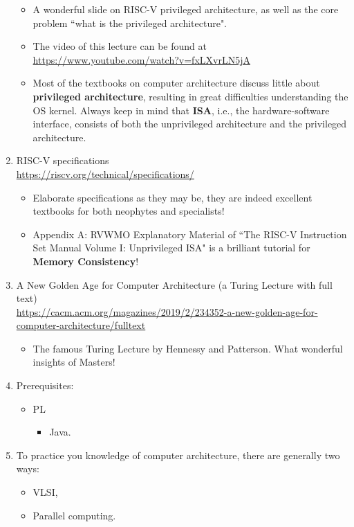 \documentclass{article}
\begin{document}
\begin{enumerate}
    \begin{itemize}
        \item A wonderful slide on RISC-V privileged architecture, as well as the core problem ``what is the privileged architecture".
        \item The video of this lecture can be found at\\ \href{https://www.youtube.com/watch?v=fxLXvrLN5jA}{https://www.youtube.com/watch?v=fxLXvrLN5jA}
        \item Most of the textbooks on computer architecture discuss little about \textbf{privileged architecture}, resulting in great difficulties understanding the OS kernel.
        Always keep in mind that \textbf{ISA}, i.e., the hardware-software interface, consists of both the unprivileged architecture and the privileged architecture.
    \end{itemize}
    \item RISC-V specifications\\
    \href{https://riscv.org/technical/specifications/}{https://riscv.org/technical/specifications/}
    \begin{itemize}
        \item Elaborate specifications as they may be, they are indeed excellent textbooks for both neophytes and specialists!
        \item Appendix A: RVWMO Explanatory Material of ``The RISC-V Instruction Set Manual Volume I: Unprivileged ISA" is a brilliant tutorial for \textbf{Memory Consistency}!
    \end{itemize}
    \item A New Golden Age for Computer Architecture (a Turing Lecture with full text)\\
    \href{https://cacm.acm.org/magazines/2019/2/234352-a-new-golden-age-for-computer-architecture/fulltext}{https://cacm.acm.org/magazines/2019/2/234352-a-new-golden-age-for-computer-architecture/fulltext}
    \begin{itemize}
        \item The famous Turing Lecture by Hennessy and Patterson.
        What wonderful insights of Masters!
    \end{itemize}
    \item Prerequisites:
    \begin{itemize}
        \item PL
        \begin{itemize}
            \item Java.
        \end{itemize}
    \end{itemize}
    \item To practice you knowledge of computer architecture, there are generally two ways:
    \begin{itemize}
        \item VLSI,
        \item Parallel computing.
    \end{itemize}
\end{enumerate}
\end{document}
